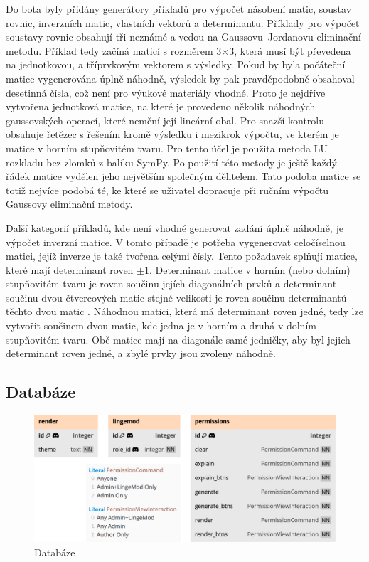 \documentclass[FM]{tulthesis}
\begin{document}
	Do bota byly přidány generátory příkladů pro výpočet násobení matic, soustav rovnic, inverzních matic, vlastních vektorů a determinantu. Příklady pro výpočet soustavy rovnic obsahují tři neznámé a vedou na Gaussovu–Jordanovu eliminační metodu. Příklad tedy začíná maticí s rozměrem 3$\times$3, která musí být převedena na jednotkovou, a tříprvkovým vektorem s výsledky. Pokud by byla počáteční matice vygenerována úplně náhodně, výsledek by pak pravděpodobně obsahoval desetinná čísla, což není pro výukové materiály vhodné. Proto je nejdříve vytvořena jednotková matice, na které je provedeno několik náhodných gaussovských operací, které nemění její lineární obal. Pro snazší kontrolu obsahuje řetězec s řešením kromě výsledku i mezikrok výpočtu, ve kterém je matice v horním stupňovitém tvaru. Pro tento účel je použita metoda LU rozkladu bez zlomků z balíku SymPy. Po použití této metody je ještě každý řádek matice vydělen jeho největším společným dělitelem. Tato podoba matice se totiž nejvíce podobá té, ke které se uživatel dopracuje při ručním výpočtu Gaussovy eliminační metody.
	
	Další kategorií příkladů, kde není vhodné generovat zadání úplně náhodně, je výpočet inverzní matice. V tomto případě je potřeba vygenerovat celočíselnou matici, jejíž inverze je také tvořena celými čísly. Tento požadavek splňují matice, které mají determinant roven $\pm1$. Determinant matice v horním (nebo dolním) stupňovitém tvaru je roven součinu jejích diagonálních prvků a determinant součinu dvou čtvercových matic stejné velikosti je roven součinu determinantů těchto dvou matic \cite{lit_lingebra}. Náhodnou matici, která má determinant roven jedné, tedy lze vytvořit součinem dvou matic, kde jedna je v horním a druhá v dolním stupňovitém tvaru. Obě matice mají na diagonále samé jedničky, aby byl jejich determinant roven jedné, a zbylé prvky jsou zvoleny náhodně.
	
	
	\subsection{Databáze}
	
	\begin{figure}[ht]
		\centering
		\includegraphics[width=\textwidth]{img/Database}
		\caption{Databáze}
		\label{_tag_img_db}
	\end{figure}
	
\end{document}
